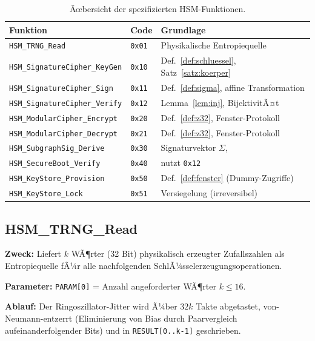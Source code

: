 ﻿\documentclass[a4paper,12pt]{article}
\theoremstyle{definition}
\begin{document}
\begin{table}[h]
	\centering
	\small
	\begin{tabular}{@{}lll@{}}
		\toprule
		Funktion & Code & Grundlage \\
		\midrule
		\texttt{HSM\_TRNG\_Read} & \texttt{0x01} & Physikalische Entropiequelle \\
		\texttt{HSM\_SignatureCipher\_KeyGen} & \texttt{0x10} & Def.~\ref{def:schluessel}, Satz~\ref{satz:koerper} \\
		\texttt{HSM\_SignatureCipher\_Sign} & \texttt{0x11} & Def.~\ref{def:sigma}, affine Transformation \\
		\texttt{HSM\_SignatureCipher\_Verify} & \texttt{0x12} & Lemma~\ref{lem:inj}, BijektivitÃ¤t \\
		\texttt{HSM\_ModularCipher\_Encrypt} & \texttt{0x20} & Def.~\ref{def:z32}, Fenster-Protokoll \\
		\texttt{HSM\_ModularCipher\_Decrypt} & \texttt{0x21} & Def.~\ref{def:z32}, Fenster-Protokoll \\
		\texttt{HSM\_SubgraphSig\_Derive} & \texttt{0x30} & Signaturvektor $\Sigma$, \cite{Epp26a} \\
		\texttt{HSM\_SecureBoot\_Verify} & \texttt{0x40} & nutzt \texttt{0x12} \\
		\texttt{HSM\_KeyStore\_Provision} & \texttt{0x50} & Def.~\ref{def:fenster} (Dummy-Zugriffe) \\
		\texttt{HSM\_KeyStore\_Lock} & \texttt{0x51} & Versiegelung (irreversibel) \\
		\bottomrule
	\end{tabular}
	\caption{Ãœbersicht der spezifizierten HSM-Funktionen.}
	\label{tab:funktionen}
\end{table}

\subsection{HSM\_TRNG\_Read}

\textbf{Zweck:} Liefert $k$ WÃ¶rter (32 Bit) physikalisch erzeugter Zufallszahlen als Entropiequelle fÃ¼r alle nachfolgenden SchlÃ¼sselerzeugungsoperationen.

\textbf{Parameter:} \texttt{PARAM[0]} = Anzahl angeforderter WÃ¶rter $k \le 16$.

\textbf{Ablauf:} Der Ringoszillator-Jitter wird Ã¼ber $32k$ Takte abgetastet, von-Neumann-entzerrt (Eliminierung von Bias durch Paarvergleich aufeinanderfolgender Bits) und in \texttt{RESULT[0..k-1]} geschrieben.
\end{document}
